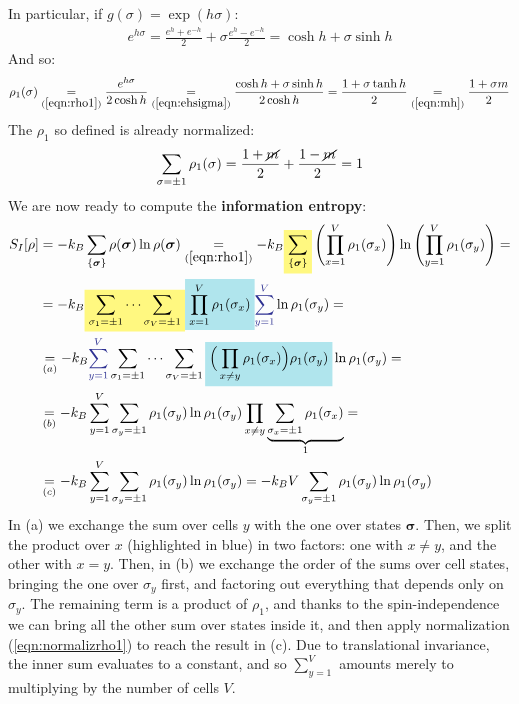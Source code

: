 \documentclass[../../main.tex]{subfiles}
\begin{document}
\begin{example}
    In particular, if $g(\sigma) = \exp(h \sigma)$:
    \begin{align}\label{eqn:ehsigma}
        e^{h \sigma} = \frac{e^h + e^{-h}}{2} + \sigma \frac{e^h - e^{-h}}{2} = \cosh h + \sigma \sinh h  
    \end{align}
    And so:
    \begin{align}\label{eqn:rho1-m}
        \rho_1(\sigma) \underset{(\ref{eqn:rho1})}{=}  \frac{e^{h \sigma}}{2 \cosh h} \underset{(\ref{eqn:ehsigma})}{=} \frac{\cosh h + \sigma \sinh h}{2 \cosh h} = \frac{1+\sigma \tanh h}{2} \underset{(\ref{eqn:mh})}{=}  \frac{1 + \sigma m}{2} 
    \end{align}
    The $\rho_1$ so defined is already normalized:
    \begin{align} \label{eqn:normalizrho1}
        \sum_{\sigma = \pm 1} \rho_1(\sigma) = \frac{1+\cancel{m}}{2} + \frac{1-\cancel{m}}{2} =   1
    \end{align}
    We are now ready to compute the \textbf{information entropy}:
    \begin{align}\nonumber
        S_I[\rho] &= -k_B \sum_{\{\bm{\sigma}\}} \rho(\bm{\sigma}) \ln \rho(\bm{\sigma}) \underset{(\ref{eqn:rho1})}{=}  -k_B \hlc{Yellow}{\sum_{\{\bm{\sigma}\}}} \left(\prod_{x=1}^V \rho_1(\sigma_x)\right) \ln \left(\prod_{y=1}^V \rho_1(\sigma_y)\right) =\\ \nonumber
        &=-k_B \hlc{Yellow}{\sum_{\sigma_1 = \pm 1} \cdots \sum_{\sigma_V = \pm 1}} \hlc{SkyBlue}{\prod_{x=1}^V \rho_1(\sigma_x)} \textcolor{Blue}{\sum_{y=1}^V} \ln \rho_1(\sigma_y) =\\ \nonumber
        &\underset{(a)}{=}  -k_B \textcolor{Blue}{\sum_{y=1}^V} \sum_{\sigma_1 = \pm 1} \cdots \sum_{\sigma_V = \pm 1} \hlc{SkyBlue}{\Big(\prod_{x \neq y} \rho_1(\sigma_x)\Big) \rho_1(\sigma_y)} \ln \rho_1 (\sigma_y) =\\\nonumber
        &\underset{(b)}{=}  -k_B \sum_{y=1}^{V} \sum_{\sigma_y = \pm 1} \rho_1(\sigma_y) \ln \rho_1(\sigma_y) \prod_{x \neq y} \underbrace{\sum_{\sigma_{x} = \pm 1} \rho_1(\sigma_x)}_{1} =\\
        &\underset{(c)}{=}  -k_B \sum_{y=1}^V \sum_{\sigma_y = \pm 1} \rho_1(\sigma_y) \ln \rho_1(\sigma_y) = -k_B V \sum_{\sigma_y = \pm 1} \rho_1(\sigma_y) \ln \rho_1(\sigma_y) \label{eqn:lstep}
    \end{align}
    In (a) we exchange the sum over cells $y$ with the one over states $\bm{\sigma}$. Then, we split the product over $x$ (highlighted in blue) in two factors: one with $x \neq y$, and the other with $x=y$. Then, in (b) we exchange the order of the sums over cell states, bringing the one over $\sigma_y$ first, and factoring out everything that depends only on $\sigma_y$. The remaining term is a product of $\rho_1$, and thanks to the spin-independence we can bring all the other sum over states inside it, and then apply normalization (\ref{eqn:normalizrho1}) to reach the result in (c). Due to translational invariance, the inner sum evaluates to a constant, and so $\sum_{y=1}^V$ amounts merely to multiplying by the number of cells $V$.


\end{example}
\end{document}
